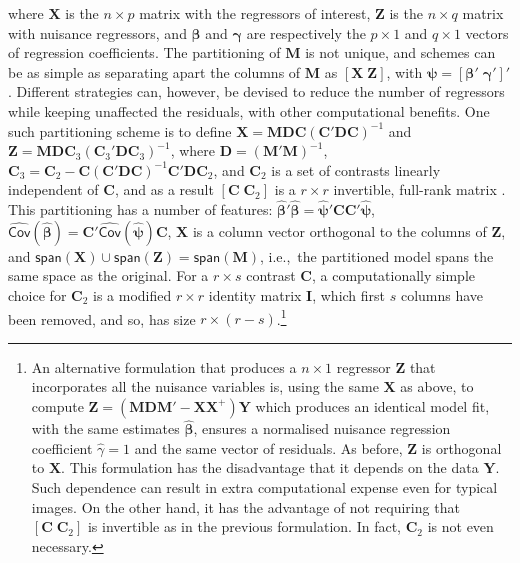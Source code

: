 \noindent
where $\mathbf{X}$ is the $n \times p$ matrix with the regressors of interest, $\mathbf{Z}$ is the $n \times q$ matrix with nuisance regressors, and $\boldsymbol{\beta}$ and $\boldsymbol{\gamma}$ are respectively the $p \times 1$ and $q \times 1$ vectors of regression coefficients. The partitioning of $\mathbf{M}$ is not unique, and schemes can be as simple as separating apart the columns of $\mathbf{M}$ as $\left[ \mathbf{X} \; \mathbf{Z} \right]$, with $\boldsymbol{\psi} = \left[ \boldsymbol{\beta}' \; \boldsymbol{\gamma}' \right]'$. Different strategies can, however, be devised to reduce the number of regressors while keeping unaffected the residuals, with other computational benefits. One such partitioning scheme is to define $\mathbf{X} = \mathbf{M} \mathbf{D} \mathbf{C} \left(\mathbf{C}'\mathbf{D}\mathbf{C}\right)^{-1}$ and $\mathbf{Z} = \mathbf{M} \mathbf{D} \mathbf{C}_3 \left(\mathbf{C}_3'\mathbf{D}\mathbf{C}_3\right)^{-1}$, where $\mathbf{D}=(\mathbf{M}'\mathbf{M})^{-1}$, $\mathbf{C}_3=\mathbf{C}_2-\mathbf{C}(\mathbf{C}'\mathbf{D}\mathbf{C})^{-1}\mathbf{C}'\mathbf{D}\mathbf{C}_2$, and $\mathbf{C}_2$ is a set of contrasts linearly independent of $\mathbf{C}$, and as a result $[\mathbf{C} \; \mathbf{C}_2]$ is a $r \times r$ invertible, full-rank matrix \citep{Beckmann2001, Smith2007}. This partitioning has a number of features: $\boldsymbol{\hat{\beta}}'\boldsymbol{\hat{\beta}} = \boldsymbol{\hat{\psi}}'\mathbf{C}\mathbf{C}'\boldsymbol{\hat{\psi}}$, $\widehat{\mathsf{Cov}}(\boldsymbol{\hat{\beta}}) = \mathbf{C}'\widehat{\mathsf{Cov}}(\boldsymbol{\hat{\psi}})\mathbf{C}$, $\mathbf{X}$ is a column vector orthogonal to the columns of $\mathbf{Z}$, and $\mathsf{span}(\mathbf{X}) \cup \mathsf{span}(\mathbf{Z}) = \mathsf{span}(\mathbf{M})$, i.e.,\ the partitioned model spans the same space as the original. For a $r \times s$ contrast $\mathbf{C}$, a computationally simple choice for $\mathbf{C}_2$ is a modified $r \times r$ identity matrix $\mathbf{I}$, which first $s$ columns have been removed, and so, has size $r \times (r-s)$.\footnote{An alternative formulation that produces a $n \times 1$ regressor $\mathbf{Z}$ that incorporates all the nuisance variables is, using the same $\mathbf{X}$ as above, to compute $\mathbf{Z} = \left(\mathbf{M}\mathbf{D}\mathbf{M}' - \mathbf{X}\mathbf{X}^{+}\right)\mathbf{Y}$ which produces an identical model fit, with the same estimates $\boldsymbol{\hat{\beta}}$, ensures a normalised nuisance regression coefficient $\hat{\gamma} = 1$ and the same vector of residuals. As before, $\mathbf{Z}$ is orthogonal to $\mathbf{X}$. This formulation has the disadvantage that it depends on the data $\mathbf{Y}$. Such dependence can result in extra computational expense even for typical images. On the other hand, it has the advantage of not requiring that $\left[\mathbf{C} \; \mathbf{C}_2\right]$ is invertible as in the previous formulation. In fact, $\mathbf{C}_2$ is not even necessary.}

